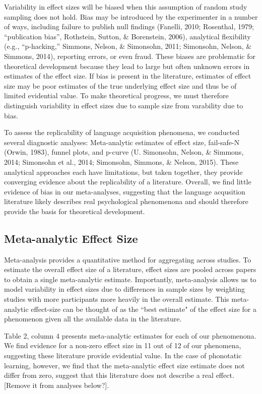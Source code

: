 \documentclass[american,floatsintext,man]{apa6}
\begin{document}
Variability in effect sizes will be biased when this assumption of
random study sampling does not hold. Bias may be introduced by the
experimenter in a number of ways, including failure to publish null
findings (Fanelli, 2010; Rosenthal, 1979; ``publication bias'',
Rothstein, Sutton, \& Borenstein, 2006), analytical flexibility (e.g.,
``p-hacking,'' Simmons, Nelson, \& Simonsohn, 2011; Simonsohn, Nelson,
\& Simmons, 2014), reporting errors, or even fraud. These biases are
problematic for theoretical development because they lead to large but
often unknown errors in estimates of the effect size. If bias is present
in the literature, estimates of effect size may be poor estimates of the
true underlying effect size and thus be of limited evidential value. To
make theoretical progress, we must therefore distinguish variability in
effect sizes due to sample size from varability due to bias.

To assess the replicability of language acquisition phenomena, we
conducted several diagnostic analyses: Meta-analytic estimates of effect
size, fail-safe-N (Orwin, 1983), funnel plots, and p-curve (U.
Simonsohn, Nelson, \& Simmons, 2014; Simonsohn et al., 2014; Simonsohn,
Simmons, \& Nelson, 2015). These analytical approaches each have
limitations, but taken together, they provide converging evidence about
the replicability of a literature. Overall, we find little evidence of
bias in our meta-analyses, suggesting that the language acqusition
literature likely describes real psychological phenomenona and should
therefore provide the basis for theoretical development.

\subsection{Meta-analytic Effect Size}\label{meta-analytic-effect-size}

Meta-analysis provides a quantitative method for aggregating across
studies. To estimate the overall effect size of a literature, effect
sizes are pooled across papers to obtain a single meta-analytic
estimate. Importantly, meta-analysis allows us to model variability in
effect sizes due to differences in sample sizes by weighting studies
with more participants more heavily in the overall estimate. This
meta-analytic effect-size can be thought of as the ``best estimate" of
the effect size for a phenomenon given all the available data in the
literature.

Table 2, column 4 presents meta-analytic estimates for each of our
phenomenona. We find evidence for a non-zero effect size in 11 out of 12
of our phenomena, suggesting these literature provide evidential value.
In the case of phonotatic learning, however, we find that the
meta-analytic effect size estimate does not differ from zero, suggest
that this literature does not describe a real effect. {[}Remove it from
analyses below?{]}.
\end{document}

